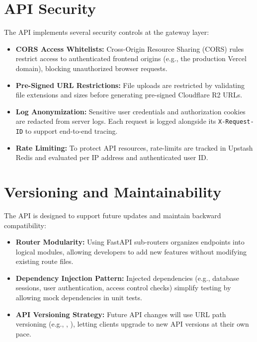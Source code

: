 \section{API Security}
The API implements several security controls at the gateway layer:
\begin{itemize}
    \item \textbf{CORS Access Whitelists:} Cross-Origin Resource Sharing (CORS) rules restrict access to authenticated frontend origins (e.g., the production Vercel domain), blocking unauthorized browser requests.
    \item \textbf{Pre-Signed URL Restrictions:} File uploads are restricted by validating file extensions and sizes before generating pre-signed Cloudflare R2 URLs.
    \item \textbf{Log Anonymization:} Sensitive user credentials and authorization cookies are redacted from server logs. Each request is logged alongside its \texttt{X-Request-ID} to support end-to-end tracing.
    \item \textbf{Rate Limiting:} To protect API resources, rate-limits are tracked in Upstash Redis and evaluated per IP address and authenticated user ID.
\end{itemize}

\section{Versioning and Maintainability}
The API is designed to support future updates and maintain backward compatibility:
\begin{itemize}
    \item \textbf{Router Modularity:} Using FastAPI sub-routers organizes endpoints into logical modules, allowing developers to add new features without modifying existing route files.
    \item \textbf{Dependency Injection Pattern:} Injected dependencies (e.g., database sessions, user authentication, access control checks) simplify testing by allowing mock dependencies in unit tests.
    \item \textbf{API Versioning Strategy:} Future API changes will use URL path versioning (e.g., , ), letting clients upgrade to new API versions at their own pace.
\end{itemize}

